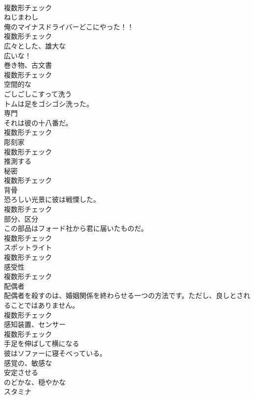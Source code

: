 \documentclass[8pt]{extreport}
\begin{document}
\begin{CJK}{UTF8}{min}
\\	複数形チェック
\\	[名詞]	ねじまわし	
\\	俺のマイナスドライバーどこにやった！！	
\\	複数形チェック
\\	[形容詞]	広々とした、雄大な	
\\	広いな！	
\\	[名詞]	巻き物、古文書	
\\	複数形チェック
\\	[形容詞]	空間的な	
\\	[動詞]	ごしごしこすって洗う	
\\	トムは足をゴシゴシ洗った。	
\\	[名詞]	専門	
\\	それは彼の十八番だ。	
\\	複数形チェック
\\	[名詞]	彫刻家	
\\	複数形チェック
\\	[動詞]	推測する	
\\	[名詞]	秘密	
\\	複数形チェック
\\	[名詞]	背骨	
\\	恐ろしい光景に彼は戦慄した。	
\\	複数形チェック
\\	[名詞]	部分、区分	
\\	この部品はフォード社から君に届いたものだ。	
\\	複数形チェック
\\	[名詞]	スポットライト	
\\	複数形チェック
\\	[名詞]	感受性	
\\	複数形チェック
\\	[名詞]	配偶者	
\\	配偶者を殺すのは、婚姻関係を終わらせる一つの方法です。ただし、良しとされることではありません。	
\\	複数形チェック
\\	[名詞]	感知装置、センサー	
\\	複数形チェック
\\	[動詞]	手足を伸ばして横になる	
\\	彼はソファーに寝そべっている。	
\\	[形容詞]	感覚の、敏感な	
\\	[動詞]	安定させる	
\\	[形容詞]	のどかな、穏やかな	
\\	[名詞]	スタミナ	

\end{CJK}
\end{document}
